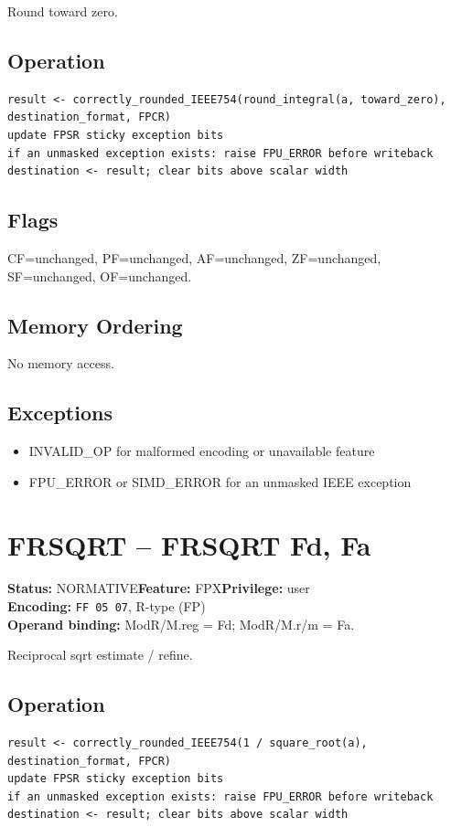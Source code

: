 \documentclass[10pt]{article}
\begin{document}
Round toward zero.

\subsection*{Operation}
\begin{lstlisting}
result <- correctly_rounded_IEEE754(round_integral(a, toward_zero), destination_format, FPCR)
update FPSR sticky exception bits
if an unmasked exception exists: raise FPU_ERROR before writeback
destination <- result; clear bits above scalar width
\end{lstlisting}
\subsection*{Flags}
CF=unchanged, PF=unchanged, AF=unchanged, ZF=unchanged, SF=unchanged, OF=unchanged.
\subsection*{Memory Ordering}
No memory access.
\subsection*{Exceptions}
\begin{itemize}
\item INVALID\_OP for malformed encoding or unavailable feature
\item FPU\_ERROR or SIMD\_ERROR for an unmasked IEEE exception
\end{itemize}
\clearpage

\section{FRSQRT -- FRSQRT Fd, Fa}
\textbf{Status:} NORMATIVE\quad \textbf{Feature:} FPX\quad \textbf{Privilege:} user\\
\textbf{Encoding:} \texttt{FF 05 07}, R-type (FP)\\
\textbf{Operand binding:} ModR/M.reg = Fd; ModR/M.r/m = Fa.

Reciprocal sqrt estimate / refine.

\subsection*{Operation}
\begin{lstlisting}
result <- correctly_rounded_IEEE754(1 / square_root(a), destination_format, FPCR)
update FPSR sticky exception bits
if an unmasked exception exists: raise FPU_ERROR before writeback
destination <- result; clear bits above scalar width
\end{lstlisting}
\end{document}
